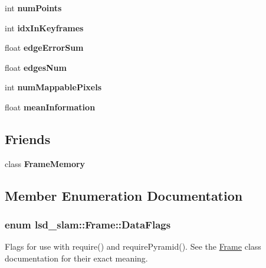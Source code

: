 \begin{DoxyCompactItemize}
\item 
\hypertarget{classlsd__slam_1_1_frame_a5d9849821321c33e90281e84d95abf37}{int {\bfseries num\-Points}}\label{classlsd__slam_1_1_frame_a5d9849821321c33e90281e84d95abf37}

\item 
\hypertarget{classlsd__slam_1_1_frame_afd88bf74afcd11574145358eac8da4b0}{int {\bfseries idx\-In\-Keyframes}}\label{classlsd__slam_1_1_frame_afd88bf74afcd11574145358eac8da4b0}

\item 
\hypertarget{classlsd__slam_1_1_frame_a6b06772b4f54122c098b9044ffd9876c}{float {\bfseries edge\-Error\-Sum}}\label{classlsd__slam_1_1_frame_a6b06772b4f54122c098b9044ffd9876c}

\item 
\hypertarget{classlsd__slam_1_1_frame_ac1d94c23c259fa087f37cf9607253010}{float {\bfseries edges\-Num}}\label{classlsd__slam_1_1_frame_ac1d94c23c259fa087f37cf9607253010}

\item 
\hypertarget{classlsd__slam_1_1_frame_a8f73786134dcc966d8f8f4ac8f7aa58c}{int {\bfseries num\-Mappable\-Pixels}}\label{classlsd__slam_1_1_frame_a8f73786134dcc966d8f8f4ac8f7aa58c}

\item 
\hypertarget{classlsd__slam_1_1_frame_ab54ac9e919e344553900a8f89f383226}{float {\bfseries mean\-Information}}\label{classlsd__slam_1_1_frame_ab54ac9e919e344553900a8f89f383226}

\end{DoxyCompactItemize}
\subsection*{Friends}
\begin{DoxyCompactItemize}
\item 
\hypertarget{classlsd__slam_1_1_frame_a301c44f1a60e7b77092f38610c22f920}{class {\bfseries Frame\-Memory}}\label{classlsd__slam_1_1_frame_a301c44f1a60e7b77092f38610c22f920}

\end{DoxyCompactItemize}


\subsection{Member Enumeration Documentation}
\hypertarget{classlsd__slam_1_1_frame_a91c2bcdbabb5db67344b5379588e6990}{
\subsubsection[{Data\-Flags}]{\setlength{\rightskip}{0pt plus 5cm}enum {\bf lsd\-\_\-slam\-::\-Frame\-::\-Data\-Flags}}}\label{classlsd__slam_1_1_frame_a91c2bcdbabb5db67344b5379588e6990}
Flags for use with require() and require\-Pyramid(). See the \hyperlink{classlsd__slam_1_1_frame}{Frame} class documentation for their exact meaning. 

